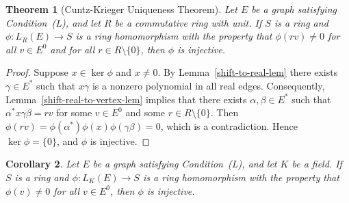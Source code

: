 \documentclass[11pt]{amsart}
\newtheorem{theorem}{Theorem}[section]
\newtheorem{corollary}[theorem]{Corollary}
\theoremstyle{remark}
\numberwithin{equation}{section}
\begin{document}
\begin{theorem}[Cuntz-Krieger Uniqueness Theorem] \label{CKUT-thm}
Let $E$ be a graph satisfying Condition~(L), and let $R$ be a commutative ring with unit.  If $S$ is a ring and $\phi : L_R(E) \to S$ is a ring homomorphism with the property that  $\phi(rv) \neq 0$ for all $v \in E^0$ and for all $r \in R \setminus \{ 0 \}$, then $\phi$ is injective.
\end{theorem}

\begin{proof}
Suppose $x \in \ker \phi$ and $x \neq 0$.  By Lemma~\ref{shift-to-real-lem} there exists $\gamma \in E^*$ such that $x \gamma$ is a nonzero polynomial in all real edges.  Consequently, Lemma~\ref{shift-real-to-vertex-lem} implies that there exists $\alpha, \beta \in E^*$ such that $\alpha^* x\gamma \beta = rv$ for some $v \in E^0$ and some $r \in R \setminus \{ 0 \}$.  Then $\phi(rv) = \phi(\alpha^*) \phi(x) \phi(\gamma \beta) = 0$, which is a contradiction.  Hence $\ker \phi = \{ 0 \}$, and $\phi$ is injective.
\end{proof}

\begin{corollary}
Let $E$ be a graph satisfying Condition~(L), and let $K$ be a field.  If $S$ is a ring and $\phi : L_K(E) \to S$ is a ring homomorphism with the property that  $\phi(v) \neq 0$ for all $v \in E^0$, then $\phi$ is injective.
\end{corollary}
\end{document}
